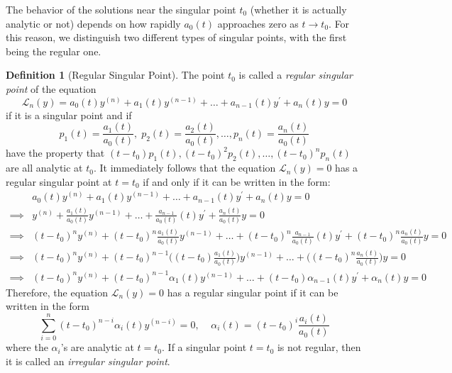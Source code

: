 \documentclass{article}
\theoremstyle{remark}
\theoremstyle{definition}
\newtheorem{definition}{Definition}[section]
\begin{document}
    The behavior of the solutions near the singular point $t_0$ (whether it is actually analytic or not) depends on how rapidly $a_0 (t)$ approaches zero as $t \rightarrow t_0$. For this reason, we distinguish two different types of singular points, with the first being the regular one. 

    \begin{definition}[Regular Singular Point]
    The point $t_0$ is called a \textit{regular singular point} of the equation 
    \[\mathcal{L}_n (y) = a_0 (t) y^{(n)} + a_1 (t) y^{(n-1)} + \ldots + a_{n-1} (t) y^\prime + a_n (t) y = 0\]
    if it is a singular point and if 
    \[p_1 (t) = \frac{a_1 (t)}{a_0 (t)}, \; p_2 (t) = \frac{a_2 (t)}{a_0 (t)}, \ldots, p_n (t) = \frac{a_n (t)}{a_0 (t)}\]
    have the property that $(t - t_0) p_1 (t), (t - t_0)^2 p_2 (t), \ldots, (t - t_0)^n p_n (t)$ are all analytic at $t_0$. It immediately follows that the equation $\mathcal{L}_n (y) = 0$ has a regular singular point at $t = t_0$ if and only if it can be written in the form:
    \begin{align*}
        & a_0 (t) y^{(n)} + a_1 (t) y^{(n-1)} + \ldots + a_{n-1} (t) y^\prime + a_n (t) y = 0\\
        \implies & y^{(n)} + \frac{a_1 (t)}{a_0 (t)} y^{(n-1)} + \ldots + \frac{a_{n-1}}{a_0 (t)} (t) y^\prime + \frac{a_n (t)}{a_0 (t)} y = 0 \\
        \implies & (t - t_0)^n y^{(n)} + (t - t_0)^n \frac{a_1 (t)}{a_0 (t)} y^{(n-1)} + \ldots + (t - t_0)^n \frac{a_{n-1}}{a_0 (t)} (t) y^\prime + (t - t_0)^n \frac{a_n (t)}{a_0 (t)} y = 0 \\
        \implies & (t - t_0)^n y^{(n)} + (t - t_0)^{n-1} \bigg((t-t_0) \frac{a_1 (t)}{a_0 (t)}\bigg) y^{(n-1)} + \ldots + \bigg( (t-t_0)^n \frac{a_n (t)}{a_0 (t)} \bigg) y = 0 \\
        \implies & (t - t_0)^n y^{(n)} + (t - t_0)^{n-1} \alpha_1 (t) y^{(n-1)} + \ldots + (t - t_0) \alpha_{n-1} (t) y^\prime + \alpha_n (t) y = 0
    \end{align*}
    Therefore, the equation $\mathcal{L}_n (y) = 0$ has a regular singular point if it can be written in the form
    \[\sum_{i=0}^n (t - t_0)^{n-i} \alpha_i (t) y^{(n-i)} = 0, \;\;\;\; \alpha_i (t) = (t - t_0)^i \frac{a_i (t)}{a_0 (t)}\]
    where the $\alpha_i$'s are analytic at $t = t_0$. If a singular point $t = t_0$ is not regular, then it is called an \textit{irregular singular point}. 
    \end{definition}
\end{document}
